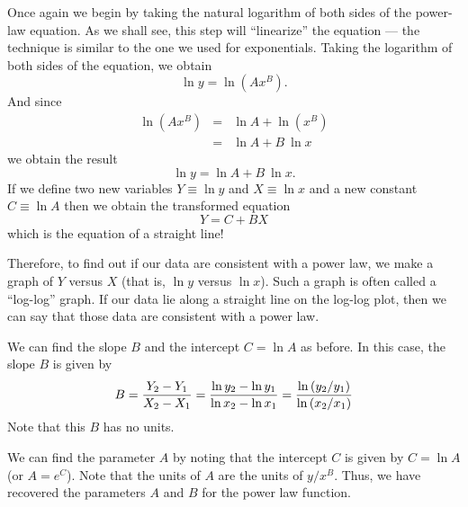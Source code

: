      Once again we begin by taking the natural logarithm of both sides of the
power-law equation. 
As we shall see, this step will ``linearize'' the equation --- 
the technique is similar to the one we used for
exponentials.  Taking the logarithm of both sides of the equation, we
obtain
\[
\ln y = \ln (Ax^{B}).
\]
And since
\begin{eqnarray*}
\ln (Ax^{B}) & = & \ln A + \ln (x^{B}) \\
              & = & \ln A + B \: \ln x
\end{eqnarray*}
we obtain the result
\[
\ln y = \ln A + B \: \ln x .
\]
If we define two new variables $Y \equiv \ln y$ and $X \equiv \ln
x$ and
a new constant $C \equiv \ln A$ then we obtain the transformed
equation
\[
Y = C + BX
\]
which is the equation of a straight line!

  Therefore, to find out if our data are consistent with a power law,
we make a graph of
$Y$ versus $X$ (that is, $\ln y$ versus $\ln x$).  Such a graph
is often called a ``log-log'' graph.  If our data lie along a straight
line on the log-log plot, then we can say that those data are consistent
with a power law.

We can find the slope $B$ and
the intercept $C= \ln A$ as before.  In this case, the slope $B$ is
given by
\[
B = {{Y_{2} - Y_{1}} \over {X_{2} - X_{1}}} =
    {{\ln y_{2} - \ln y_{1}} \over {\ln x_{2} - \ln x_{1}}} =
{\ln\left(y_2/y_1\right) \over \ln\left(x_2/x_1\right) }
\]
Note that this $B$ has no units.

We can find the parameter $A$ by noting that the intercept $C$ is
given by $C = \ln A$ (or $A = {e}^{C}$).  
Note that the units of $A$ are the units of $y/x^B$.
Thus, we have
recovered the parameters $A$ and $B$ for the power law function.


